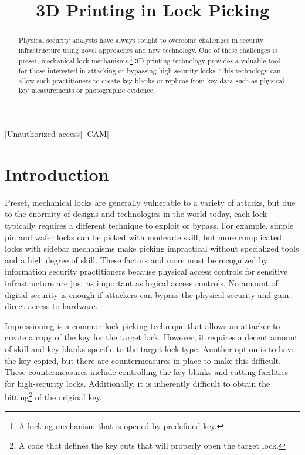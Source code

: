 \documentclass{acm_proc_article-sp}
\title{3D Printing in Lock Picking}
\begin{document}
\maketitle

\begin{abstract}
    Physical security analysts have always sought to overcome challenges in security infrastructure using novel approaches and new technology. One of these challenges is preset, mechanical lock mechanisms.\footnote{A locking mechanism that is opened by predefined key.} 3D printing technology provides a valuable tool for those interested in attacking or bypassing high-security locks. This technology can allow such practitioners to create key blanks or replicas from key data such as physical key measurements or photographic evidence.
\end{abstract}

[Unauthorized access] 
[CAM]


\section{Introduction}
Preset, mechanical locks are generally vulnerable to a variety of attacks, but due to the enormity of designs and technologies in the world today, each lock typically requires a different technique to exploit or bypass. For example, simple pin and wafer locks can be picked with moderate skill, but more complicated locks with sidebar mechanisms make picking impractical without specialized tools and a high degree of skill. These factors and more must be recognized by information security practitioners because physical access controls for sensitive infrastructure are just as important as logical access controls. No amount of digital security is enough if attackers can bypass the physical security and gain direct access to hardware.

Impressioning is a common lock picking technique that allows an attacker to create a copy of the key for the target lock. However, it requires a decent amount of skill and key blanks specific to the target lock type. Another option is to have the key copied, but there are countermeasures in place to make this difficult. These countermeasures include controlling the key blanks and cutting facilities for high-security locks. Additionally, it is inherently difficult to obtain the bitting\footnote{A code that defines the key cuts that will properly open the target lock.} of the original key.
\end{document}
